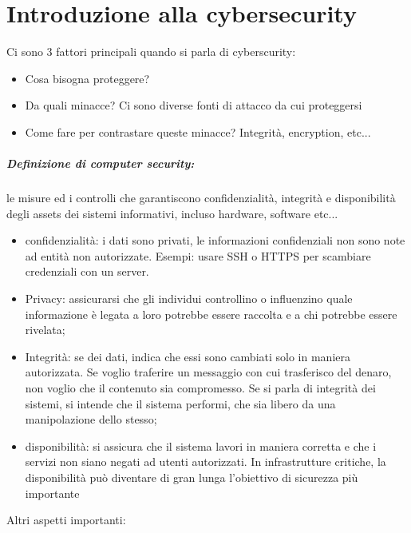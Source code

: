 \documentclass[12pt, oneside]{extbook} %
\begin{document}
\chapter{Introduzione alla cybersecurity}
Ci sono 3 fattori principali quando si parla di cyberscurity:
\begin{itemize}
\item Cosa bisogna proteggere?
\item Da quali minacce? Ci sono diverse fonti di attacco da cui proteggersi
\item Come fare per contrastare queste minacce? Integrità, encryption, etc...
\end{itemize}
\paragraph{Definizione di computer security:}le misure ed i controlli che garantiscono confidenzialità, integrità e disponibilità degli assets dei sistemi informativi, incluso hardware, software etc...
\begin{itemize}
\item confidenzialità: i dati sono privati, le informazioni confidenziali non sono note ad entità non autorizzate. Esempi: usare SSH o HTTPS per scambiare credenziali con un server.
\item Privacy: assicurarsi che gli individui controllino o influenzino quale informazione è legata a loro potrebbe essere raccolta e a chi potrebbe essere rivelata;
\item Integrità: se dei dati, indica che essi sono cambiati solo in maniera autorizzata. Se voglio traferire un messaggio con cui trasferisco del denaro, non voglio che il contenuto sia compromesso. Se si parla di integrità dei sistemi, si intende che il sistema performi, che sia libero da una manipolazione dello stesso;
\item disponibilità: si assicura che il sistema lavori in maniera corretta e che i servizi non siano negati ad utenti autorizzati. In infrastrutture critiche, la disponibilità può diventare di gran lunga l'obiettivo di sicurezza più importante
\end{itemize}
Altri aspetti importanti:
\end{document}
